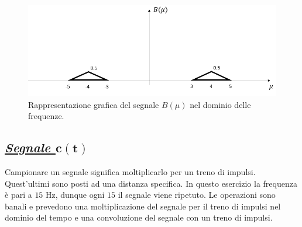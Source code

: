 \documentclass[a4paper]{article}
\begin{document}
	\begin{figure}[!htp]
		\centering
		\includegraphics[width=\textwidth]{img/fig_2.png}
		\caption*{Rappresentazione grafica del segnale $B\left(\mu\right)$ nel dominio delle frequenze.}
	\end{figure}\newpage
	
	\subsection*{\textcolor{Green4}{\underline{\textbf{\emph{Segnale $\boldsymbol{c\left(t\right)}$}}}}}
	
	Campionare un segnale significa moltiplicarlo per un treno di impulsi. Quest'ultimi sono posti ad una distanza specifica. In questo esercizio la frequenza è pari a $15$ Hz, dunque ogni $15$ il segnale viene ripetuto. Le operazioni sono banali e prevedono una moltiplicazione del segnale per il treno di impulsi nel dominio del tempo e una convoluzione del segnale con un treno di impulsi.\newline
	
\end{document}
